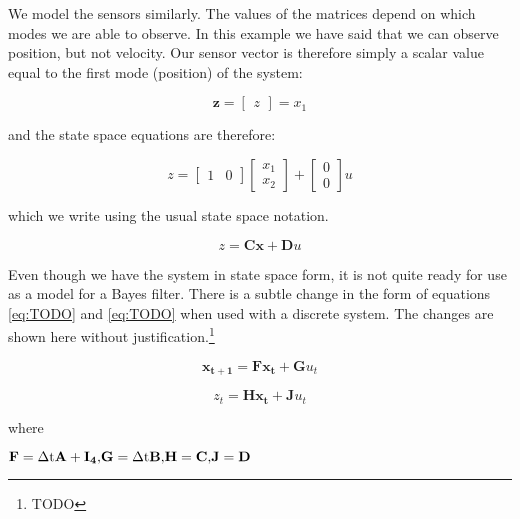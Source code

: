 We model the sensors similarly. The values of the matrices depend on which modes
we are able to observe. In this example we have said that we can observe position,
but not velocity. Our sensor vector is therefore simply a scalar value equal to
the first mode (position) of the system:

\begin{equation}
    \mathbf{z} =
    \begin{bmatrix}
        z
    \end{bmatrix}
    = x_{1}
\end{equation}

and the state space equations are therefore:

\begin{equation}
    z =
    \begin{bmatrix}
        1 & 0
    \end{bmatrix}
    \begin{bmatrix}
        x_{1} \\
        x_{2}
    \end{bmatrix}
    +
    \begin{bmatrix}
        0 \\
        0
    \end{bmatrix}
    u
\end{equation}

which we write using the usual state space notation.

\begin{equation}
z = \mathbf{C}\mathbf{x} + \mathbf{D}u
\end{equation}

Even though we have the system in state space form, it is not quite ready for
use as a model for a Bayes filter. There is a subtle change in the form of equations
\ref{eq:TODO} and \ref{eq:TODO} when used with a discrete system. The changes are shown here
without justification.\footnote{TODO}

\begin{equation}
\mathbf{x_{t+1}} = \mathbf{F}\mathbf{x_{t}} + \mathbf{G}u_{t}
\end{equation}

\begin{equation}
z_{t} = \mathbf{H}\mathbf{x_{t}} + \mathbf{J}u_{t}
\end{equation}

where

\begin{math}
    \mathbf{F} = \mathrm{\Delta t}\mathbf{A} + \mathbf{I_{4}}
    \textrm{,}\quad\\
    \mathbf{G} = \mathrm{\Delta t}\mathbf{B}
    \textrm{,}\quad\\
    \mathbf{H} = \mathbf{C}
    \textrm{,}\quad\\
    \mathbf{J} = \mathbf{D}
\end{math}

